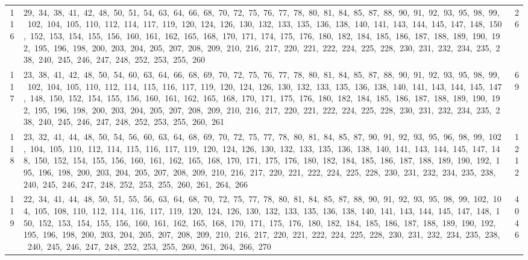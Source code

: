 \begin{longtable}{c|p{}|r}
116 & 29,\ 34,\ 38,\ 41,\ 42,\ 48,\ 50,\ 51,\ 54,\ 63,\ 64,\ 66,\ 68,\ 70,\ 72,\ 75,\ 76,\ 77,\ 78,\ 80,\ 81,\ 84,\ 85,\ 87,\ 88,\ 90,\ 91,\ 92,\ 93,\ 95,\ 98,\ 99,\ 102,\ 104,\ 105,\ 110,\ 112,\ 114,\ 117,\ 119,\ 120,\ 124,\ 126,\ 130,\ 132,\ 133,\ 135,\ 136,\ 138,\ 140,\ 141,\ 143,\ 144,\ 145,\ 147,\ 148,\ 150,\ 152,\ 153,\ 154,\ 155,\ 156,\ 160,\ 161,\ 162,\ 165,\ 168,\ 170,\ 171,\ 174,\ 175,\ 176,\ 180,\ 182,\ 184,\ 185,\ 186,\ 187,\ 188,\ 189,\ 190,\ 192,\ 195,\ 196,\ 198,\ 200,\ 203,\ 204,\ 205,\ 207,\ 208,\ 209,\ 210,\ 216,\ 217,\ 220,\ 221,\ 222,\ 224,\ 225,\ 228,\ 230,\ 231,\ 232,\ 234,\ 235,\ 238,\ 240,\ 245,\ 246,\ 247,\ 248,\ 252,\ 253,\ 255,\ 260 & 26 \\
117 & 23,\ 38,\ 41,\ 42,\ 48,\ 50,\ 54,\ 60,\ 63,\ 64,\ 66,\ 68,\ 69,\ 70,\ 72,\ 75,\ 76,\ 77,\ 78,\ 80,\ 81,\ 84,\ 85,\ 87,\ 88,\ 90,\ 91,\ 92,\ 93,\ 95,\ 98,\ 99,\ 102,\ 104,\ 105,\ 110,\ 112,\ 114,\ 115,\ 116,\ 117,\ 119,\ 120,\ 124,\ 126,\ 130,\ 132,\ 133,\ 135,\ 136,\ 138,\ 140,\ 141,\ 143,\ 144,\ 145,\ 147,\ 148,\ 150,\ 152,\ 154,\ 155,\ 156,\ 160,\ 161,\ 162,\ 165,\ 168,\ 170,\ 171,\ 175,\ 176,\ 180,\ 182,\ 184,\ 185,\ 186,\ 187,\ 188,\ 189,\ 190,\ 192,\ 195,\ 196,\ 198,\ 200,\ 203,\ 204,\ 205,\ 207,\ 208,\ 209,\ 210,\ 216,\ 217,\ 220,\ 221,\ 222,\ 224,\ 225,\ 228,\ 230,\ 231,\ 232,\ 234,\ 235,\ 238,\ 240,\ 245,\ 246,\ 247,\ 248,\ 252,\ 253,\ 255,\ 260,\ 261 & 69 \\
118 & 23,\ 32,\ 41,\ 44,\ 48,\ 50,\ 54,\ 56,\ 60,\ 63,\ 64,\ 68,\ 69,\ 70,\ 72,\ 75,\ 77,\ 78,\ 80,\ 81,\ 84,\ 85,\ 87,\ 90,\ 91,\ 92,\ 93,\ 95,\ 96,\ 98,\ 99,\ 102,\ 104,\ 105,\ 110,\ 112,\ 114,\ 115,\ 116,\ 117,\ 119,\ 120,\ 124,\ 126,\ 130,\ 132,\ 133,\ 135,\ 136,\ 138,\ 140,\ 141,\ 143,\ 144,\ 145,\ 147,\ 148,\ 150,\ 152,\ 154,\ 155,\ 156,\ 160,\ 161,\ 162,\ 165,\ 168,\ 170,\ 171,\ 175,\ 176,\ 180,\ 182,\ 184,\ 185,\ 186,\ 187,\ 188,\ 189,\ 190,\ 192,\ 195,\ 196,\ 198,\ 200,\ 203,\ 204,\ 205,\ 207,\ 208,\ 209,\ 210,\ 216,\ 217,\ 220,\ 221,\ 222,\ 224,\ 225,\ 228,\ 230,\ 231,\ 232,\ 234,\ 235,\ 238,\ 240,\ 245,\ 246,\ 247,\ 248,\ 252,\ 253,\ 255,\ 260,\ 261,\ 264,\ 266 & 1212 \\
119 & 22,\ 34,\ 41,\ 44,\ 48,\ 50,\ 51,\ 55,\ 56,\ 63,\ 64,\ 68,\ 70,\ 72,\ 75,\ 77,\ 78,\ 80,\ 81,\ 84,\ 85,\ 87,\ 88,\ 90,\ 91,\ 92,\ 93,\ 95,\ 98,\ 99,\ 102,\ 104,\ 105,\ 108,\ 110,\ 112,\ 114,\ 116,\ 117,\ 119,\ 120,\ 124,\ 126,\ 130,\ 132,\ 133,\ 135,\ 136,\ 138,\ 140,\ 141,\ 143,\ 144,\ 145,\ 147,\ 148,\ 150,\ 152,\ 153,\ 154,\ 155,\ 156,\ 160,\ 161,\ 162,\ 165,\ 168,\ 170,\ 171,\ 175,\ 176,\ 180,\ 182,\ 184,\ 185,\ 186,\ 187,\ 188,\ 189,\ 190,\ 192,\ 195,\ 196,\ 198,\ 200,\ 203,\ 204,\ 205,\ 207,\ 208,\ 209,\ 210,\ 216,\ 217,\ 220,\ 221,\ 222,\ 224,\ 225,\ 228,\ 230,\ 231,\ 232,\ 234,\ 235,\ 238,\ 240,\ 245,\ 246,\ 247,\ 248,\ 252,\ 253,\ 255,\ 260,\ 261,\ 264,\ 266,\ 270 & 4046 \\

\end{longtable}

